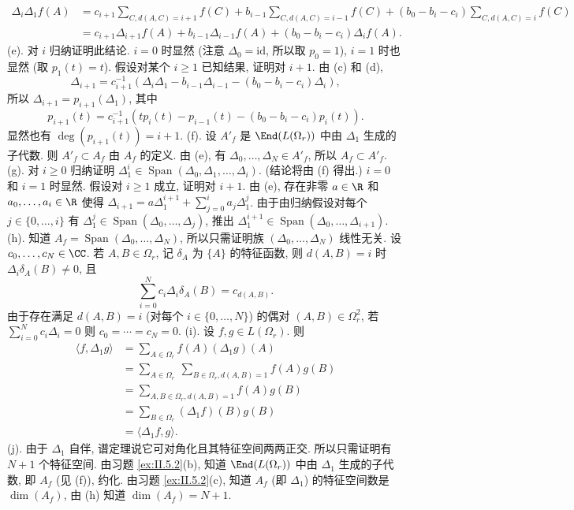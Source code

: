 \begin{solution}
\begin{align*}
\Delta_i\Delta_1f(A) &= c_{i+1}\sum_{C, d(A,C)=i+1}f(C) + b_{i-1}\sum_{C, d(A,C)=i-1}f(C) + (b_0 - b_i - c_i)\sum_{C, d(A,C)=i}f(C) \\
&= c_{i+1}\Delta_{i+1}f(A) + b_{i-1}\Delta_{i-1}f(A) + (b_0 - b_i - c_i)\Delta_if(A).
\end{align*}
(e). 对 $i$ 归纳证明此结论. $i = 0$ 时显然 (注意 $\Delta_0 = \mathrm{id}$, 所以取 $p_0 = 1$), $i = 1$ 时也显然 (取 $p_1(t) = t$). 假设对某个 $i \geq 1$ 已知结果, 证明对 $i + 1$. 由 (c) 和 (d),
\[
\Delta_{i+1} = c_{i+1}^{-1}(\Delta_i\Delta_1 - b_{i-1}\Delta_{i-1} - (b_0 - b_i - c_i)\Delta_i),
\]
所以 $\Delta_{i+1} = p_{i+1}(\Delta_1)$, 其中
\[
p_{i+1}(t) = c_{i+1}^{-1}(tp_i(t) - p_{i-1}(t) - (b_0 - b_i - c_i)p_i(t)).
\]
显然也有 $\deg(p_{i+1}(t)) = i + 1$.
(f). 设 $A'_f$ 是 $\End(L(\Omega_r))$ 中由 $\Delta_1$ 生成的子代数. 则 $A'_f \subset A_f$ 由 $A_f$ 的定义. 由 (e), 有 $\Delta_0, \ldots, \Delta_N \in A'_f$, 所以 $A_f \subset A'_f$.
(g). 对 $i \geq 0$ 归纳证明 $\Delta_1^i \in \operatorname{Span}(\Delta_0, \Delta_1, \ldots, \Delta_i)$. (结论将由 (f) 得出.) $i = 0$ 和 $i = 1$ 时显然. 假设对 $i \geq 1$ 成立, 证明对 $i + 1$. 由 (e), 存在非零 $a \in \R$ 和 $a_0, \ldots, a_i \in \R$ 使得 $\Delta_{i+1} = a\Delta_1^{i+1} + \sum_{j=0}^i a_j\Delta_1^j$. 由于由归纳假设对每个 $j \in \{0, \ldots, i\}$ 有 $\Delta_1^j \in \operatorname{Span}(\Delta_0, \ldots, \Delta_j)$, 推出 $\Delta_1^{i+1} \in \operatorname{Span}(\Delta_0, \ldots, \Delta_{i+1})$.
(h). 知道 $A_f = \operatorname{Span}(\Delta_0, \ldots, \Delta_N)$, 所以只需证明族 $(\Delta_0, \ldots, \Delta_N)$ 线性无关. 设 $c_0, \ldots, c_N \in \CC$. 若 $A, B \in \Omega_r$, 记 $\delta_A$ 为 $\{A\}$ 的特征函数, 则 $d(A, B) = i$ 时 $\Delta_i\delta_A(B) \neq 0$, 且
\[
\sum_{i=0}^N c_i\Delta_i\delta_A(B) = c_{d(A,B)}.
\]
由于存在满足 $d(A, B) = i$ (对每个 $i \in \{0, \ldots, N\}$) 的偶对 $(A, B) \in \Omega_r^2$, 若 $\sum_{i=0}^N c_i\Delta_i = 0$ 则 $c_0 = \cdots = c_N = 0$.
(i). 设 $f, g \in L(\Omega_r)$. 则
\begin{align*}
\langle f, \Delta_1g \rangle &= \sum_{A \in \Omega_r}f(A)(\Delta_1g)(A) \\
&= \sum_{A \in \Omega_r}\ \sum_{B \in \Omega_r, d(A,B)=1}f(A)g(B) \\
&= \sum_{A,B \in \Omega_r, d(A,B)=1}f(A)g(B) \\
&= \sum_{B \in \Omega_r}(\Delta_1f)(B)g(B) \\
&= \langle \Delta_1f, g \rangle.
\end{align*}
(j). 由于 $\Delta_1$ 自伴, 谱定理说它可对角化且其特征空间两两正交. 所以只需证明有 $N + 1$ 个特征空间. 由习题 \ref{ex:II.5.2}(b), 知道 $\End(L(\Omega_r))$ 中由 $\Delta_1$ 生成的子代数, 即 $A_f$ (见 (f)), 约化. 由习题 \ref{ex:II.5.2}(c), 知道 $A_f$ (即 $\Delta_1$) 的特征空间数是 $\dim(A_f)$, 由 (h) 知道 $\dim(A_f) = N + 1$.
\end{solution}

